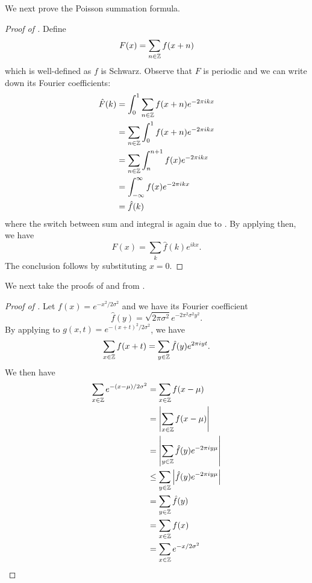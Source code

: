 \documentclass{article}
\begin{document}
We next prove the Poisson summation formula.

\begin{proof}[Proof of ]
	Define
	\begin{equation}
		F(x)=\sum_{n\in\mathbb{Z}}f(x+n)
	\end{equation}
	which is well-defined as $f$ is Schwarz.
	Observe that $F$ is periodic and we can write down its Fourier coefficients:
	\begin{align}
		\hat{F}(k)&=\int_0^1 \sum_{n\in\mathbb{Z}} f(x+n)e^{-2\pi ikx} \\
		&=\sum_{n\in\mathbb{Z}} \int_0^1 f(x+n)e^{-2\pi ikx} \\
		&=\sum_{n\in\mathbb{Z}} \int_n^{n+1} f(x)e^{-2\pi ikx} \\
		&=\int_{-\infty}^{\infty} f(x)e^{-2\pi ikx} \\
		&=\hat{f}(k)
	\end{align}
	where the switch between sum and integral is again due to .
	By applying  then, we have
	\begin{equation}
		F(x)=\sum_k \hat{f}(k) e^{ikx}.
	\end{equation}
	The conclusion follows by substituting $x=0$.
\end{proof}

We next take the proofs of  and  from \cite{discrete-gaussian}.

\begin{proof}[Proof of ]
	Let $f(x)=e^{-x^2/2\sigma^2}$ and we have its Fourier coefficient
	\begin{equation}
		\hat{f}(y)=\sqrt{2\pi\sigma^2}e^{-2\pi^2\sigma^2y^2}.
	\end{equation}
	By applying  to $g(x, t)=e^{-(x+t)^2/2\sigma^2}$,
	we have
	\begin{equation}
		\sum_{x\in\mathbb{Z}}f(x+t)=\sum_{y\in\mathbb{Z}}\hat{f}(y)e^{2\pi iyt}.
	\end{equation}
	We then have
	\begin{align}
		\sum_{x\in\mathbb{Z}}e^{-(x-\mu)/2\sigma^2}
		&=\sum_{x\in\mathbb{Z}}f(x-\mu)\\
		&=\abs{\sum_{x\in\mathbb{Z}}f(x-\mu)} \\
		&=\abs{\sum_{y\in\mathbb{Z}}\hat{f}(y)e^{-2\pi iy\mu}} \\
		&\leq\sum_{y\in\mathbb{Z}}\abs{\hat{f}(y)e^{-2\pi iy\mu}} \\
		&=\sum_{y\in\mathbb{Z}}\hat{f}(y) \\
		&=\sum_{x\in\mathbb{Z}}f(x) \\
		&=\sum_{x\in\mathbb{Z}}e^{-x/2\sigma^2}
	\end{align}
\end{proof}
\end{document}
